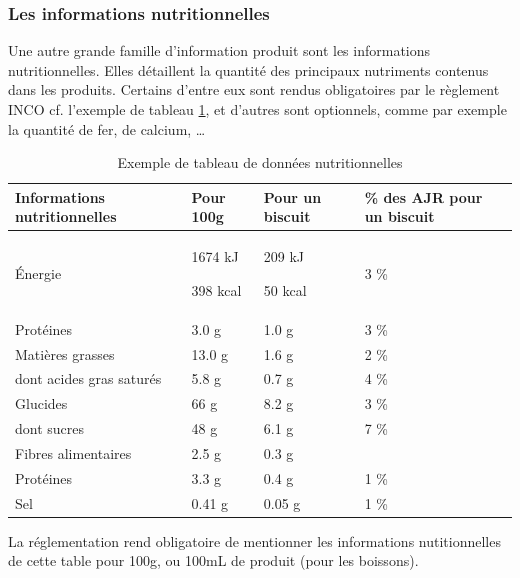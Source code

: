                 \subsubsection{Les informations nutritionnelles}

                Une autre grande famille d'information produit sont les informations nutritionnelles. 
                Elles détaillent la quantité des principaux nutriments contenus dans les produits.
                Certains d'entre eux sont rendus obligatoires par le règlement INCO\cite{incotext}\cite{incoexpl} cf. l'exemple de tableau \ref{tab:donnees_nut}, et d'autres sont optionnels, comme par exemple la quantité de fer, de calcium, \dots

                \begin{table}[htbp]
                    \begin{center}
                    \begin{tabularx}{\linewidth}{|X|X|X|X|}
                        \hline
                        \textbf{Informations nutritionnelles} & \textbf{Pour 100g} & \textbf{Pour un biscuit} & \textbf{\% des AJR pour un biscuit} \\
                        \hline
                        \'{E}nergie &1674 kJ
                        
                        398 kcal & 209 kJ
                        
                        50 kcal & 3 \% \\
                        \hline
                        Protéines & 3.0 g & 1.0 g & 3 \% \\ 
                        \hline
                        Matières grasses & 13.0 g & 1.6 g & 2 \% \\
                        \hline
                        dont acides gras saturés & 5.8 g & 0.7 g & 4 \% \\
                        \hline
                        Glucides & 66 g & 8.2 g & 3 \% \\
                        \hline
                        dont sucres & 48 g & 6.1 g & 7 \% \\
                        \hline
                        Fibres alimentaires & 2.5 g & 0.3 g &\\
                        \hline
                        Protéines & 3.3 g & 0.4 g & 1 \% \\
                        \hline
                        Sel & 0.41 g & 0.05 g & 1 \% \\
                        \hline
                    \end{tabularx}
                    \end{center}
                    \caption{Exemple de tableau de données nutritionnelles}
                    \label{tab:donnees_nut}
                \end{table}
                La réglementation rend obligatoire de mentionner les informations nutitionnelles de cette table pour 100g, ou 100mL de produit (pour les boissons).

